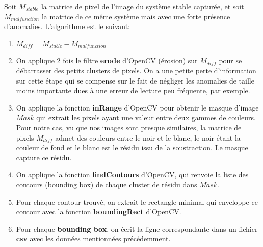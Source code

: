 \documentclass[french]{article}
\theoremstyle{mytheoremstyle}
\theoremstyle{mytheoremstyle}
\theoremstyle{myproblemstyle}
\begin{document}
        \newline
        Soit $M_{stable}$ la matrice de pixel de l'image du système stable capturée, et soit $M_{malfunction}$ la matrice de ce même système mais avec une forte présence d'anomalies.
        L'algorithme est le suivant:
        \begin{enumerate}
            \item $M_{diff} = M_{stable} - M_{malfunction}$
            \item On applique 2 fois le filtre \textbf{erode} d'OpenCV (érosion) sur $M_{diff}$ pour se débarrasser des petits clusters de pixels. On a une petite perte d'information sur cette étape qui se compense sur le fait de négliger les anomalies de taille moins importante dues à une erreur de lecture peu fréquente, par exemple.
            \item On applique la fonction \textbf{inRange} d'OpenCV pour obtenir le masque d'image $Mask$ qui extrait les pixels ayant une valeur entre deux gammes de couleurs. Pour notre cas, vu que nos images sont presque similaires, la matrice de pixels $M_{diff}$ admet des couleurs entre le noir et le blanc, le noir étant la couleur de fond et le blanc est le résidu issu de la soustraction. Le masque capture ce résidu.
            \item On applique la fonction \textbf{findContours} d'OpenCV, qui renvoie la liste des contours (bounding box) de chaque cluster de résidu dans $Mask$.
            \item Pour chaque contour trouvé, on extrait le rectangle minimal qui enveloppe ce contour avec la fonction \textbf{boundingRect} d'OpenCV.
            \item Pour chaque \textbf{bounding box}, on écrit la ligne correspondante dans un fichier \textbf{csv} avec les données mentionnées précédemment.
        \end{enumerate}
\end{document}
